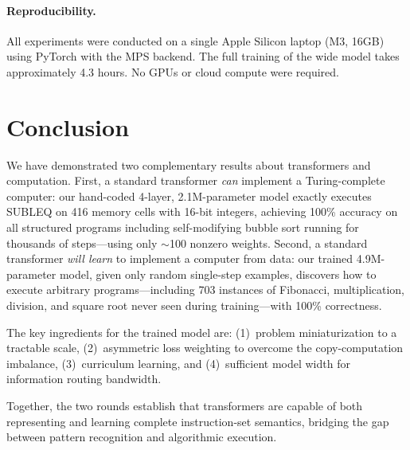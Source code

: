 \documentclass[11pt,a4paper]{article}
\begin{document}
\paragraph{Reproducibility.}
All experiments were conducted on a single Apple Silicon laptop (M3, 16GB) using PyTorch with the MPS backend.
The full training of the wide model takes approximately 4.3 hours.
No GPUs or cloud compute were required.

\section{Conclusion}

We have demonstrated two complementary results about transformers and computation.
First, a standard transformer \emph{can} implement a Turing-complete computer: our hand-coded 4-layer, 2.1M-parameter model exactly executes SUBLEQ on 416 memory cells with 16-bit integers, achieving 100\% accuracy on all structured programs including self-modifying bubble sort running for thousands of steps---using only $\sim$100 nonzero weights.
Second, a standard transformer \emph{will learn} to implement a computer from data: our trained 4.9M-parameter model, given only random single-step examples, discovers how to execute arbitrary programs---including 703 instances of Fibonacci, multiplication, division, and square root never seen during training---with 100\% correctness.

The key ingredients for the trained model are: (1)~problem miniaturization to a tractable scale, (2)~asymmetric loss weighting to overcome the copy-computation imbalance, (3)~curriculum learning, and (4)~sufficient model width for information routing bandwidth.

Together, the two rounds establish that transformers are capable of both representing and learning complete instruction-set semantics, bridging the gap between pattern recognition and algorithmic execution.
\end{document}
